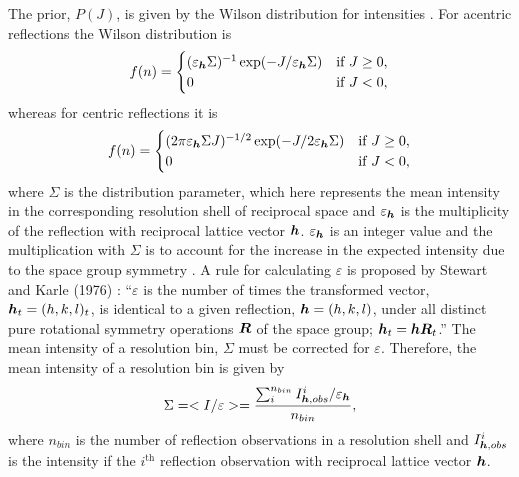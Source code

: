 The prior, $P(J)$, is given by the Wilson distribution for intensities \cite{wilson1949probability}.
For acentric reflections the Wilson distribution is
\begin{equation}
    f(n) =
    \begin{cases}
        (\varepsilon_{\boldsymbol{h}}\Sigma)^{-1} \exp(-J/\varepsilon_{\boldsymbol{h}}\Sigma) & \mbox{if } J \ge 0, \\
        0                           & \mbox{if } J < 0,
    \end{cases}
    \label{eq:Wilson Distribution for acentric reflections - Intensities}
\end{equation}
whereas for centric reflections it is
\begin{equation}
    f(n) =
    \begin{cases}
        (2\pi\varepsilon_{\boldsymbol{h}}\Sigma J)^{-1/2} \exp(-J/2\varepsilon_{\boldsymbol{h}}\Sigma) & \mbox{if } J \ge 0, \\
        0                                      & \mbox{if } J < 0,
    \end{cases}
    \label{eq:Wilson Distribution for centric reflections - Intensities}
\end{equation}
where $\Sigma$ is the distribution parameter, which here represents the mean intensity in the corresponding resolution shell of reciprocal space and $\varepsilon_{\boldsymbol{h}}$ is the multiplicity of the reflection with reciprocal lattice vector $\boldsymbol{h}$. $\varepsilon_{\boldsymbol{h}}$ is an integer value and the multiplication with $\Sigma$ is to account for the increase in the expected intensity due to the space group symmetry \cite{blessing1998intensity}. A rule for calculating $\varepsilon$ is proposed by Stewart and Karle (1976) \cite{stewart1976}: ``$\varepsilon$ is the number of times the transformed vector, $\boldsymbol{h}_t = (h,k,l)_t$, is identical to a given reflection, $\boldsymbol{h} = (h,k,l)$, under all distinct pure rotational symmetry operations $\boldsymbol{R}$ of the space group; $\boldsymbol{h}_t = \boldsymbol{h}\boldsymbol{R}_t$.''
The mean intensity of a resolution bin, $\Sigma$ must be corrected for $\varepsilon$.
Therefore, the mean intensity of a resolution bin is given by
\begin{equation}
    \Sigma = <I/\varepsilon> = \frac{\sum^{n_{bin}}_i I^i_{\boldsymbol{h},obs}/\varepsilon_{\boldsymbol{h}}}{n_{bin}},
    \label{eq:Mean intensity of resolution bin}
\end{equation}
where $n_{bin}$ is the number of reflection observations in a resolution shell and $I^i_{\boldsymbol{h},obs}$ is the intensity if the $i^{\text{th}}$ reflection observation with reciprocal lattice vector $\boldsymbol{h}$.

